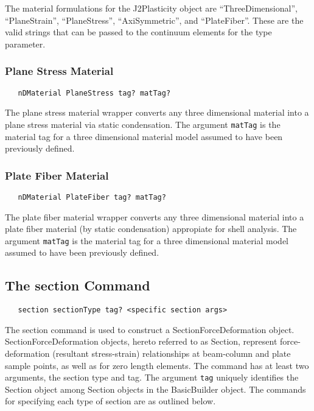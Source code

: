 \documentclass[12pt]{article}
\begin{document}
The material formulations for the J2Plasticity object are
``ThreeDimensional'', ``PlaneStrain'', ``PlaneStress'', ``AxiSymmetric'',
and ``PlateFiber''. These are the valid strings that can be passed to the
continuum elements for the type parameter. 


\subsubsection{Plane Stress Material}
{\sf\small
\begin{verbatim}
   nDMaterial PlaneStress tag? matTag? 
\end{verbatim}
}
The plane stress material wrapper converts any three dimensional 
material into a plane stress material via static condensation.
The argument {\tt matTag} is the material tag for a three 
dimensional material model assumed to have been previously defined.


\subsubsection{Plate Fiber Material}
{\sf\small
\begin{verbatim}
   nDMaterial PlateFiber tag? matTag? 
\end{verbatim}
}
The plate fiber material wrapper converts any three dimensional 
material into a plate fiber material (by static condensation) appropiate
for shell analysis.
The argument {\tt matTag} is the material tag for a three 
dimensional material model  assumed to have been previously defined.


\subsection{The section Command}
{\sf\small
\begin{verbatim}
   section sectionType tag? <specific section args>
\end{verbatim}
}

The section command is used to construct a SectionForceDeformation object.
SectionForceDeformation objects, hereto referred to as Section, represent force-deformation (resultant stress-strain) relationships at beam-column and
plate sample points, as well as for zero length elements. The
command has at least two arguments, the section type and tag.
The argument {\tt tag}
uniquely identifies the 
Section object among Section objects in the BasicBuilder object.
The
commands for specifying each type of section are as outlined below.
\end{document}
